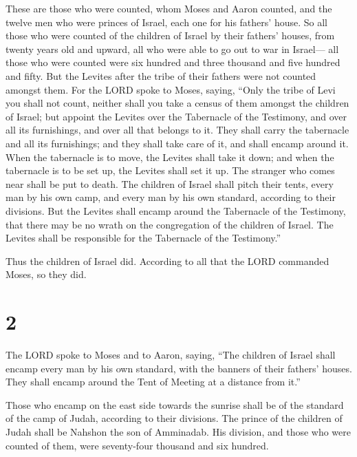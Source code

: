  These are those who were counted, whom Moses and Aaron
counted, and the twelve men who were princes of Israel, each one for his
fathers' house.  So all those who were counted of the
children of Israel by their fathers' houses, from twenty years old and
upward, all who were able to go out to war in Israel--- 
all those who were counted were six hundred and three thousand and five
hundred and fifty.  But the Levites after the tribe of
their fathers were not counted amongst them.  For the
LORD spoke to Moses, saying,  ``Only the tribe of Levi
you shall not count, neither shall you take a census of them amongst the
children of Israel;  but appoint the Levites over the
Tabernacle of the Testimony, and over all its furnishings, and over all
that belongs to it. They shall carry the tabernacle and all its
furnishings; and they shall take care of it, and shall encamp around it.
 When the tabernacle is to move, the Levites shall take
it down; and when the tabernacle is to be set up, the Levites shall set
it up. The stranger who comes near shall be put to death.
 The children of Israel shall pitch their tents, every
man by his own camp, and every man by his own standard, according to
their divisions.  But the Levites shall encamp around the
Tabernacle of the Testimony, that there may be no wrath on the
congregation of the children of Israel. The Levites shall be responsible
for the Tabernacle of the Testimony.''

 Thus the children of Israel did. According to all that
the LORD commanded Moses, so they did.

\hypertarget{section-1}{%
\section{2}\label{section-1}}

 The LORD spoke to Moses and to Aaron, saying,
 ``The children of Israel shall encamp every man by his
own standard, with the banners of their fathers' houses. They shall
encamp around the Tent of Meeting at a distance from it.''

 Those who encamp on the east side towards the sunrise
shall be of the standard of the camp of Judah, according to their
divisions. The prince of the children of Judah shall be Nahshon the son
of Amminadab.  His division, and those who were counted of
them, were seventy-four thousand and six hundred.

